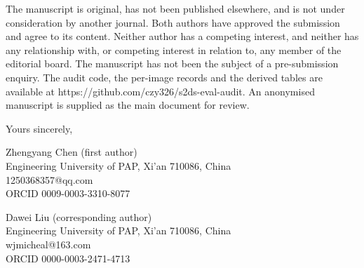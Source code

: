\documentclass[11pt]{article}
\begin{document}
The manuscript is original, has not been published elsewhere, and is not under consideration by another journal. Both authors have approved the submission and agree to its content. Neither author has a competing interest, and neither has any relationship with, or competing interest in relation to, any member of the editorial board. The manuscript has not been the subject of a pre-submission enquiry. The audit code, the per-image records and the derived tables are available at https://github.com/czy326/s2ds-eval-audit. An anonymised manuscript is supplied as the main document for review.

Yours sincerely,

Zhengyang Chen (first author)\\
Engineering University of PAP, Xi'an 710086, China\\
1250368357@qq.com\\
ORCID 0009-0003-3310-8077

Dawei Liu (corresponding author)\\
Engineering University of PAP, Xi'an 710086, China\\
wjmicheal@163.com\\
ORCID 0000-0003-2471-4713
\end{document}

